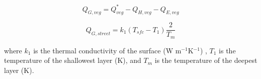 \documentclass[final,3p,times,authoryear]{elsarticle}
\begin{document}
\begin{equation}\label{eq:qgvtuf}
 Q_{G,veg} =  Q^{*}_{veg} - Q_{H,veg} - Q_{E,veg}
\end{equation}

\begin{equation}\label{eq:qgtuf}
 Q_{G,street} = k_{1}  ( T_{sfc} - T_{1} ) \frac {2}{T_{m}}
\end{equation}

where $k_{1}$ is the thermal conductivity of the surface (W m$^{-1}$K$^{-1}$) , $T_{1}$ is the temperature of the shallowest layer (K), and $T_{m}$ is the temperature of the deepest layer (K).







\end{document}
